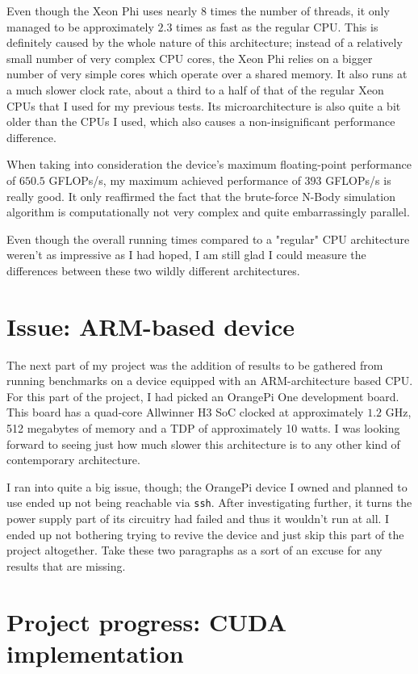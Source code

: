 \documentclass[journal]{IEEEtran}
\begin{document}
			Even though the Xeon Phi uses nearly 8 times the number of threads, it only managed to be approximately $2.3$ times as fast as the regular CPU. This is definitely caused by the whole nature of this architecture; instead of a relatively small number of very complex CPU cores, the Xeon Phi relies on a bigger number of very simple cores which operate over a shared memory. It also runs at a much slower clock rate, about a third to a half of that of the regular Xeon CPUs that I used for my previous tests. Its microarchitecture is also quite a bit older than the CPUs I used, which also causes a non-insignificant performance difference.			
			
			When taking into consideration the device's maximum floating-point performance of $650.5$ GFLOPs/s, my maximum achieved performance of $393$ GFLOPs/s is really good. It only reaffirmed the fact that the brute-force N-Body simulation algorithm is computationally not very complex and quite embarrassingly parallel.
			
			Even though the overall running times compared to a "regular" CPU architecture weren't as impressive as I had hoped, I am still glad I could measure the differences between these two wildly different architectures.
		
	\section{Issue: ARM-based device}
	\label{orangepi}
	
		The next part of my project was the addition of results to be gathered from running benchmarks on a device equipped with an ARM-architecture based CPU. For this part of the project, I had picked an OrangePi One development board. This board has a quad-core Allwinner H3 SoC clocked at approximately $1.2$ GHz, 512 megabytes of memory and a TDP of approximately 10 watts. I was looking forward to seeing just how much slower this architecture is to any other kind of contemporary architecture.
		
		I ran into quite a big issue, though; the OrangePi device I owned and planned to use ended up not being reachable via \texttt{ssh}. After investigating further, it turns the power supply part of its circuitry had failed and thus it wouldn't run at all. I ended up not bothering trying to revive the device and just skip this part of the project altogether. Take these two paragraphs as a sort of an excuse for any results that are missing.
	
	\section{Project progress: CUDA implementation}
	\label{cudasection}
	
\end{document}
